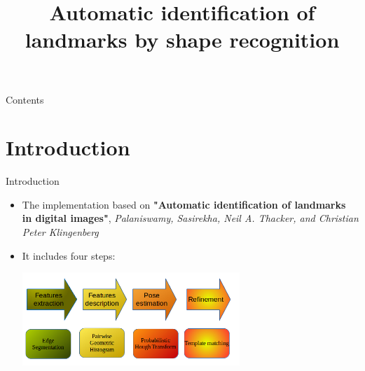 \documentclass{beamer}
\title{Automatic identification of landmarks by shape recognition}
\begin{document}
\frame{\titlepage}
\begin{frame}{Contents}
	\tableofcontents
\end{frame}
\section{Introduction}
\begin{frame}{Introduction}
	\begin{itemize}
	\item The implementation based on \textbf{"Automatic identification of landmarks in digital images"}, \textit{Palaniswamy, Sasirekha, Neil A. Thacker, and Christian Peter Klingenberg} \\
	\item It includes four steps:
		\begin{center}
			\includegraphics[height=3.5cm]{images/flow_step.png}	
		\end{center}
	\end{itemize}
\end{frame}
\end{document}
